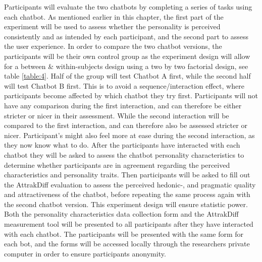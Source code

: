    Participants will evaluate the two chatbots by completing a series of tasks using each chatbot. As mentioned earlier in this chapter, the first part of the experiment will be used to assess whether the personality is perceived consistently and as intended by each participant, and the second part to assess the user experience. In order to compare the two chatbot versions, the participants will be their own control group as the experiment design will allow for a between \& within-subjects design using a two by two factorial design, see table \ref{table:4}. Half of the group will test Chatbot A first, while the second half will test Chatbot B first. This is to avoid a sequence/interaction effect, where participants become affected by which chatbot they try first. Participants will not have any comparison during the first interaction, and can therefore be either stricter or nicer in their assessment. While the second interaction will be compared to the first interaction, and can therefore also be assessed stricter or nicer. Participant's might also feel more at ease during the second interaction, as they now know what to do. After the participants have interacted with each chatbot they will be asked to assess the chatbot personality characteristics to determine whether participants are in agreement regarding the perceived characteristics and personality traits. Then participants will be asked to fill out the AttrakDiff evaluation to assess the perceived hedonic-, and pragmatic quality and attractiveness of the chatbot, before repeating the same process again with the second chatbot version. This experiment design will ensure statistic power. Both the personality characteristics data collection form and the AttrakDiff measurement tool will be presented to all participants after they have interacted with each chatbot. The participants will be presented with the same form for each bot, and the forms will be accessed locally through the researchers private computer in order to ensure participants anonymity. 
  
    
